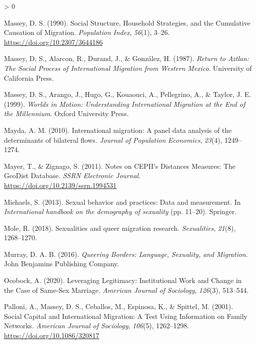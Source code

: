\documentclass[
  12pt,
]{article}
\newlength{\cslhangindent}
\newenvironment{CSLReferences}[2] %
 {%
  \setlength{\parindent}{0pt}
  \ifodd #1 \everypar{\setlength{\hangindent}{\cslhangindent}}\ignorespaces\fi
  \ifnum #2 > 0
  \setlength{\parskip}{#2\baselineskip}
  \fi
 }%
 {}
\begin{document}
\begin{CSLReferences}{1}{0}
\leavevmode\hypertarget{ref-massey_1990_social}{}%
Massey, D. S. (1990). Social {Structure}, {Household Strategies}, and the {Cumulative Causation} of {Migration}. \emph{Population Index}, \emph{56}(1), 3--26. \url{https://doi.org/10.2307/3644186}

\leavevmode\hypertarget{ref-massey_1987}{}%
Massey, D. S., Alarcon, R., Durand, J., \& González, H. (1987). \emph{Return to {Aztlan}: The {Social Process} of {International Migration} from {Western Mexico}}. {University of California Press}.

\leavevmode\hypertarget{ref-massey_1999}{}%
Massey, D. S., Arango, J., Hugo, G., Kouaouci, A., Pellegrino, A., \& Taylor, J. E. (1999). \emph{Worlds in {Motion}: Understanding {International Migration} at the {End} of the {Millennium}}. {Oxford University Press}.

\leavevmode\hypertarget{ref-mayda_2010}{}%
Mayda, A. M. (2010). International migration: A panel data analysis of the determinants of bilateral flows. \emph{Journal of Population Economics}, \emph{23}(4), 1249--1274.

\leavevmode\hypertarget{ref-mayer_2011}{}%
Mayer, T., \& Zignago, S. (2011). Notes on {CEPII}'s {Distances Measures}: The {GeoDist Database}. \emph{SSRN Electronic Journal}. \url{https://doi.org/10.2139/ssrn.1994531}

\leavevmode\hypertarget{ref-michaels_2013}{}%
Michaels, S. (2013). Sexual behavior and practices: Data and measurement. In \emph{International handbook on the demography of sexuality} (pp. 11--20). {Springer}.

\leavevmode\hypertarget{ref-mole_2018a}{}%
Mole, R. (2018). Sexualities and queer migration research. \emph{Sexualities}, \emph{21}(8), 1268--1270.

\leavevmode\hypertarget{ref-murray_2016}{}%
Murray, D. A. B. (2016). \emph{Queering {Borders}: Language, {Sexuality}, and {Migration}}. {John Benjamins Publishing Company}.

\leavevmode\hypertarget{ref-ocobock_2020_leveraging}{}%
Ocobock, A. (2020). Leveraging {Legitimacy}: Institutional {Work} and {Change} in the {Case} of {Same}-{Sex Marriage}. \emph{American Journal of Sociology}, \emph{126}(3), 513--544.

\leavevmode\hypertarget{ref-palloni_2001}{}%
Palloni, A., Massey, D. S., Ceballos, M., Espinosa, K., \& Spittel, M. (2001). Social {Capital} and {International Migration}: A {Test Using Information} on {Family Networks}. \emph{American Journal of Sociology}, \emph{106}(5), 1262--1298. \url{https://doi.org/10.1086/320817}


\end{CSLReferences}
\end{document}
